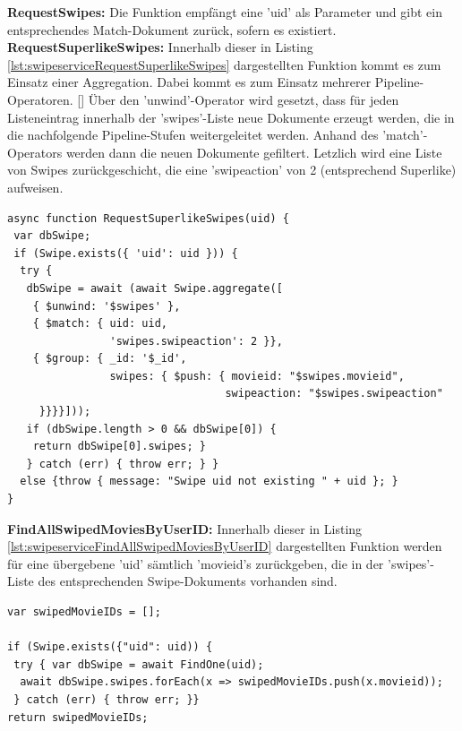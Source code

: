 \noindent
\textbf{RequestSwipes:}
Die Funktion empfängt eine 'uid' als Parameter und gibt ein entsprechendes Match-Dokument zurück, sofern es existiert.\\

\noindent
\textbf{RequestSuperlikeSwipes:}
Innerhalb dieser in Listing \ref{lst:swipeserviceRequestSuperlikeSwipes} dargestellten Funktion kommt es zum Einsatz einer Aggregation. 
Dabei kommt es zum Einsatz mehrerer Pipeline-Operatoren. []
Über den 'unwind'-Operator wird gesetzt, dass für jeden Listeneintrag innerhalb der 'swipes'-Liste neue Dokumente erzeugt werden, die in die nachfolgende Pipeline-Stufen weitergeleitet werden. Anhand des 'match'-Operators werden dann die neuen Dokumente gefiltert. Letzlich wird eine Liste von Swipes zurückgeschicht, die eine 'swipeaction' von 2 (entsprechend Superlike) aufweisen.\\

\begin{lstlisting}[caption=Swipe Service - RequestSuperlikeSwipes, label=lst:swipeserviceRequestSuperlikeSwipes]
async function RequestSuperlikeSwipes(uid) {
 var dbSwipe;
 if (Swipe.exists({ 'uid': uid })) {
  try {
   dbSwipe = await (await Swipe.aggregate([
    { $unwind: '$swipes' },
    { $match: { uid: uid,
                'swipes.swipeaction': 2 }},
    { $group: { _id: '$_id',
                swipes: { $push: { movieid: "$swipes.movieid",
                                  swipeaction: "$swipes.swipeaction" 
     }}}}]));
   if (dbSwipe.length > 0 && dbSwipe[0]) {
    return dbSwipe[0].swipes; }
   } catch (err) { throw err; } }
  else {throw { message: "Swipe uid not existing " + uid }; }
}
\end{lstlisting}

\noindent
\textbf{FindAllSwipedMoviesByUserID:}
Innerhalb dieser in Listing \ref{lst:swipeserviceFindAllSwipedMoviesByUserID} dargestellten Funktion werden für eine übergebene 'uid' sämtlich 'movieid's zurückgeben, die in der 'swipes'-Liste des entsprechenden Swipe-Dokuments vorhanden sind.\\

\begin{lstlisting}[caption=Swipe Service - FindAllSwipedMoviesByUserID, label=lst:swipeserviceFindAllSwipedMoviesByUserID]
var swipedMovieIDs = [];
    
if (Swipe.exists({"uid": uid)) {
 try { var dbSwipe = await FindOne(uid);
  await dbSwipe.swipes.forEach(x => swipedMovieIDs.push(x.movieid));
 } catch (err) { throw err; }}
return swipedMovieIDs;
\end{lstlisting}



